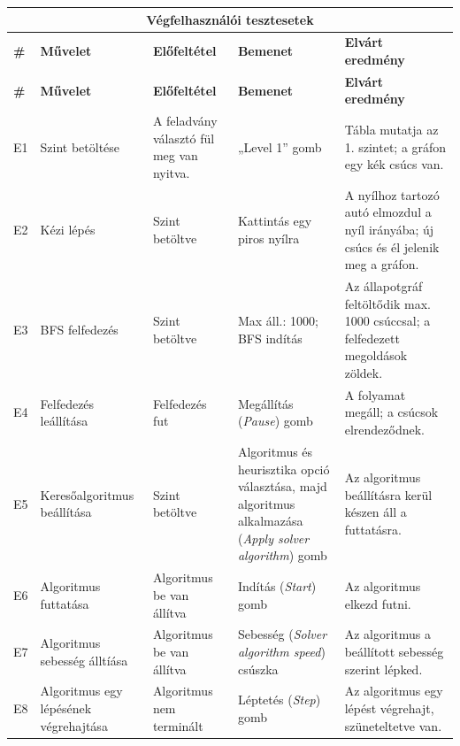 \begin{longtable}{ | p{} | p{} | p{} | p{} | p{} | }

\hline
\multicolumn{5}{|c|}{\textbf{Végfelhasználói tesztesetek}}
\\ \hline
\textbf{\#} & \textbf{Művelet} & \textbf{Előfeltétel} & \textbf{Bemenet} & \textbf{Elvárt eredmény}
\\ \hline \hline
\endfirsthead

\hline
\textbf{\#} & \textbf{Művelet} & \textbf{Előfeltétel} & \textbf{Bemenet} & \textbf{Elvárt eredmény}
\\ \hline \hline
\endhead

\hline
\endfoot
\endlastfoot

E1
& Szint betöltése
& A feladvány választó fül meg van nyitva.
& „Level 1” gomb
& Tábla mutatja az 1. szintet; a gráfon egy kék csúcs van.
\\ \hline

E2
& Kézi lépés
& Szint betöltve
& Kattintás egy piros nyílra
& A nyílhoz tartozó autó elmozdul a nyíl irányába; új csúcs és él jelenik meg a gráfon.
\\ \hline

E3
& BFS felfedezés
& Szint betöltve
& Max áll.: 1000; BFS indítás
& Az állapotgráf feltöltődik max. 1000 csúccsal; a felfedezett megoldások zöldek.
\\ \hline

E4
& Felfedezés leállítása
& Felfedezés fut
& Megállítás (\textit{Pause}) gomb
& A folyamat megáll; a csúcsok elrendeződnek.
\\ \hline

E5
& Keresőalgoritmus beállítása
& Szint betöltve
& Algoritmus és heurisztika opció választása, majd algoritmus alkalmazása (\textit{Apply solver algorithm}) gomb 
& Az algoritmus beállításra kerül készen áll a futtatásra.
\\ \hline

E6
& Algoritmus futtatása
& Algoritmus be van állítva
& Indítás (\textit{Start}) gomb
& Az algoritmus elkezd futni.
\\ \hline

E7
& Algoritmus sebesség álltíása
& Algoritmus be van állítva
& Sebesség (\textit{Solver algorithm speed}) csúszka
& Az algoritmus a beállított sebesség szerint lépked.
\\ \hline

E8
& Algoritmus egy lépésének végrehajtása 
& Algoritmus nem terminált
& Léptetés (\textit{Step}) gomb
& Az algoritmus egy lépést végrehajt, szüneteltetve van.
\\ \hline


\end{longtable}
